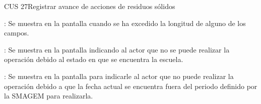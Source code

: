 \begin{UseCase}{CUS 27}{Registrar avance de acciones de residuos sólidos}
{\begin{UClist}
	    \UCli {}: Se muestra en la pantalla  cuando se ha excedido la longitud de alguno de los campos.	
	    
	    \UCli  {}: Se muestra en la pantalla  indicando al actor que no se puede realizar la operación debido al estado en que se encuentra la escuela.
	    
	    \UCli {}: Se muestra en la pantalla  para indicarle al actor que no puede realizar la operación debido a que la fecha actual se encuentra fuera del periodo definido por la SMAGEM para realizarla.
	\end{UClist}
    }

    


\end{UseCase}


